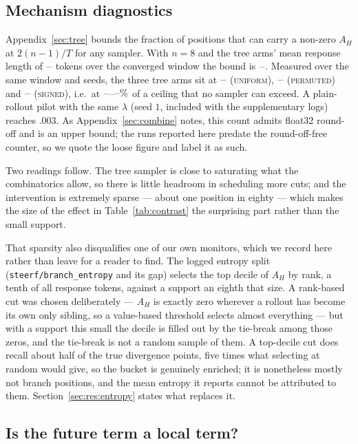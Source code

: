 \documentclass[11pt]{article}
\newcommand{\AH}{A_{H}}
\providecommand{\PENDING}{\textcolor{red}{\textbf{--}}}
\newcommand{\num}[1]{\ifcsname #1\endcsname\csname #1\endcsname\else\PENDING\fi}
\begin{document}
\subsection{Mechanism diagnostics}
\label{sec:res:diag}

Appendix~\ref{sec:tree} bounds the fraction of positions that can carry a non-zero
$\AH$ at $2(n-1)/T$ for any sampler. With $n = 8$ and the tree arms' mean response
length of $\num{Treelen}$ tokens over the converged window the bound is
$\num{Supportbound}$. Measured over the same window and seeds, the three tree arms
sit at $\num{Runiformbranchfrac}$ (\textsc{uniform}), $\num{Rpermutedbranchfrac}$
(\textsc{permuted}) and $\num{Rsignedbranchfrac}$ (\textsc{signed}), i.e.\ at
$\num{Supportpctlo}$--$\num{Supportpcthi}\%$ of a ceiling that no sampler can
exceed. A plain-rollout pilot with the same $\lambda$ (seed $1$, included with the
supplementary logs) reaches $.003$. As Appendix~\ref{sec:combine} notes, this
count admits float32 round-off and is an upper bound; the runs reported here predate
the round-off-free counter, so we quote the loose figure and label it as such.

Two readings follow. The tree sampler is close to saturating what the combinatorics
allow, so there is little headroom in scheduling more cuts; and the intervention is
extremely sparse --- about one position in eighty --- which makes the size of the
effect in Table~\ref{tab:contrast} the surprising part rather than the small support.

That sparsity also disqualifies one of our own monitors, which we record here rather
than leave for a reader to find. The logged entropy split
(\texttt{steerf/branch\_entropy} and its gap) selects the top decile of $\AH$ by
rank, a tenth of all response tokens, against a support an eighth that size. A
rank-based cut was chosen deliberately --- $\AH$ is exactly zero wherever a rollout
has become its own only sibling, so a value-based threshold selects almost
everything --- but with a support this small the decile is filled out by the
tie-break among those zeros, and the tie-break is not a random sample of them.
A top-decile cut does recall about half of the true divergence points, five times
what selecting at random would give, so the bucket is genuinely enriched; it is
nonetheless mostly not branch positions, and the mean entropy it reports cannot be
attributed to them. Section~\ref{sec:res:entropy} states what replaces it.

\subsection{Is the future term a local term?}
\label{sec:res:locality}
\end{document}
